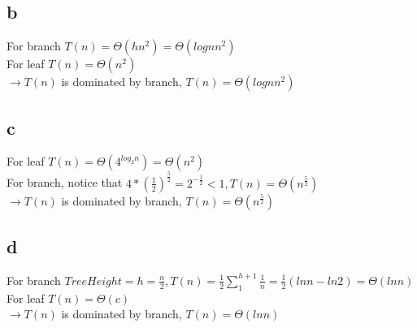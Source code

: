 \documentclass[]{article}
\begin{document}
\subsection{b}
For branch $T(n) = \Theta(hn^2) = \Theta(lognn^2)$\\
For leaf $T(n) = \Theta(n^2)$\\
$\rightarrow T(n)$ is dominated by branch, $T(n) =\Theta(lognn^2)$

\subsection{c}
For leaf $T(n) = \Theta(4^{log_{2}n}) = \Theta(n^2)$\\
For branch, notice that $4*(\frac{1}{2})^{\frac{5}{2}} = 2^{-\frac{1}{2}} < 1, T(n) = \Theta(n^{\frac{5}{2}})$\\
$\rightarrow T(n)$ is dominated by branch, $T(n) =\Theta(n^{\frac{5}{2}})$

\subsection{d}
For branch $TreeHeight = h = \frac{n}{2}, T(n) = \frac{1}{2}\sum_{1}^{h + 1} \frac{1}{n} = \frac{1}{2}(lnn-ln2) = \Theta(lnn)$\\
For leaf $T(n) = \Theta(c)$\\
$\rightarrow T(n)$ is dominated by branch, $T(n) =\Theta(lnn)$
\end{document}
